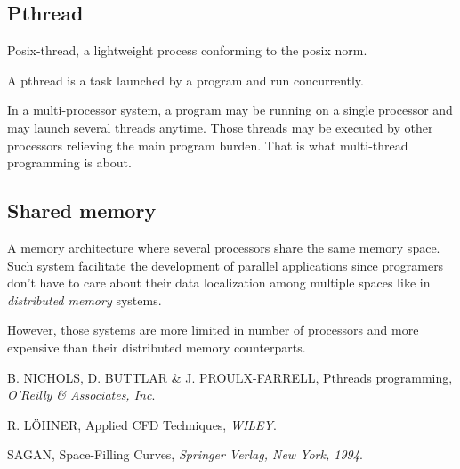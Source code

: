 \documentclass[a4paper,12pt]{article}
\begin{document}
\subsection{Pthread}
Posix-thread, a lightweight process conforming to the posix norm.

A pthread is a task launched by a program and run concurrently.

In a multi-processor system, a program may be running on a single processor and may launch several threads anytime. Those threads may be executed by other processors relieving the main program burden. That is what multi-thread programming is about.

\subsection{Shared memory}
A memory architecture where several processors share the same memory space. Such system facilitate the development of parallel applications since programers don't have to care about their data localization among multiple spaces like in \emph{distributed memory} systems.

However, those systems are more limited in number of processors and more expensive than their distributed memory counterparts.


%
%


\begin{thebibliography}{99}
\small

	B. NICHOLS, D. BUTTLAR \& J. PROULX-FARRELL,
	Pthreads programming,
	\emph{O'Reilly \& Associates, Inc}.

	R. L\"OHNER,
	Applied CFD Techniques,
	\emph{WILEY}.

	SAGAN,
	Space-Filling Curves,
	\emph{Springer Verlag, New York, 1994}.

\end{thebibliography}
\end{document}
